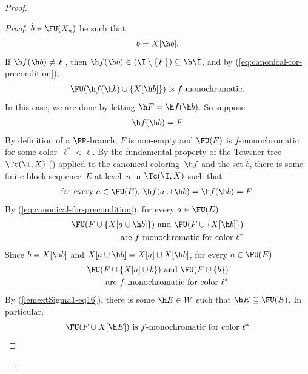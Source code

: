 \documentclass{article}
\numberwithin{theorem}{section}
\begin{document}
\begin{proof}
\begin{proof}
$\hat b\in \FU(X_n)$
be such that
$$b = X[\h b].$$
If $\h f(\h b) \neq F$, then $\h f(\h b) \in (\I \setminus \{F\}) \subseteq \h \I$, and by (\ref{eq:canonical-for-precondition}),
\begin{align}\label{lemextSigma1-eq20-second-display}
\FU(\h f(\h b) \cup \{X[\h b]\})\text{ is $f$-monochromatic.}
\end{align}
In this case, we are done by letting $\h F = \h f(\h b)$. So suppose
\begin{align}\label{newlemextSigma1-good-color}
\h f(\h b) = F
\end{align}
By definition of a $\PP$-branch, $F$ is non-empty and $\FU(F)$ is $f$-monochromatic for some color~$\ell^* < \ell$.
By the fundamental property of the Towsner tree $\Tc(\I, X)$ () applied to the canonical coloring~$\h f$ and the set $\hat b$, there is some finite block sequence~$E$ at level~$n$ in $\Tc(\I, X)$ such that
\begin{align}\label{newlemextSigma1-eq2}
\text{for every $a \in \FU(E)$, $\h f(a \cup \h b) = \h f(\h b) = F$.} 
\end{align}
By (\ref{eq:canonical-for-precondition}), for every $a \in \FU(E)$
\begin{align}\label{newlemextSigma1-eq3}
\text{$\FU(F \cup \{X[a \cup \h b]\})$ and $\FU(F \cup \{X[\h b]\})$} \notag\\
\text{are $f$-monochromatic for color~$\ell^*$}
\end{align}
Since $b = X[\h b]$ and $X[a \cup \h b] = X[a] \cup X[\h b]$, for every $a \in \FU(E)$
\begin{align}\label{newlemextSigma1-eq5}
\text{$\FU(F \cup \{X[a] \cup b\})$ and $\FU(F \cup \{b\})$} \notag\\
\text{are $f$-monochromatic for color~$\ell^*$}
\end{align}
By (\ref{lemextSigma1-eq16}), there is some $\h E \in W$ such that $\h E \subseteq \FU(E)$. In particular, 
\begin{align}\label{newlemextSigma1-eq4}
\text{$\FU(F \cup X[\h E])$ is $f$-monochromatic for color~$\ell^*$}
\end{align}

\end{proof}
\end{proof}
\end{document}

